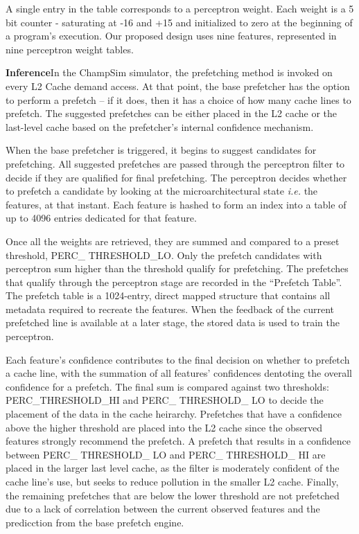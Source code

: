 A single entry in the table corresponds to a perceptron weight.  Each
weight is a 5 bit counter - saturating at -16 and +15 and initialized
to zero at the beginning of a program's execution. Our proposed design
uses nine features, represented in nine perceptron weight
tables. 

 \textbf{Inference}\newline In the ChampSim simulator, the
prefetching method is invoked on every L2 Cache demand access.  At
that point, the base prefetcher has the option to perform a prefetch
-- if it does, then it has a choice of how many cache lines to
prefetch.  The suggested prefetches can be either placed in the L2
cache or the last-level cache based on the prefetcher's internal
confidence mechanism.


When the base prefetcher is triggered, it begins to suggest candidates
for prefetching.  All suggested prefetches are passed through the
perceptron filter to decide if they are qualified for final
prefetching.  The perceptron decides whether to prefetch a candidate
by looking at the microarchitectural state \textit{i.e.} the features,
at that instant.  Each feature is hashed to form an index into a table
of up to 4096 entries dedicated for that feature.

Once all the weights are retrieved, they are summed and compared to a
preset threshold, PERC\_ THRESHOLD\_LO.  Only the prefetch candidates
with perceptron sum higher than the threshold qualify for prefetching.
The prefetches that qualify through the perceptron stage are recorded
in the ``Prefetch Table''. The prefetch table is a 1024-entry, direct
mapped structure that contains all metadata required to recreate the
features.  %
When the feedback of the current prefetched line is available at a
later stage, the stored data is used to train the perceptron.


Each feature's confidence contributes to the final decision on 
whether to prefetch a cache line, with the summation of all features' 
confidences dentoting the overall confidence for a prefetch. 
The final sum is compared against two thresholds: 
 PERC\_THRESHOLD\_HI and  PERC\_ THRESHOLD\_ LO to decide the
 placement of the data in the cache heirarchy. Prefetches that 
have a confidence above the higher threshold are placed into 
the L2 cache since the observed features strongly recommend  
the prefetch. A prefetch that results in a confidence between 
PERC\_ THRESHOLD\_ LO and PERC\_ THRESHOLD\_ HI are placed in 
the larger last level cache, as the filter is moderately confident of 
the cache line's use, but seeks to reduce pollution in the smaller 
L2 cache. Finally, the remaining prefetches that are below the 
lower threshold are not prefetched due to a lack of correlation 
between the current observed features and the predicction from 
the base prefetch engine.

